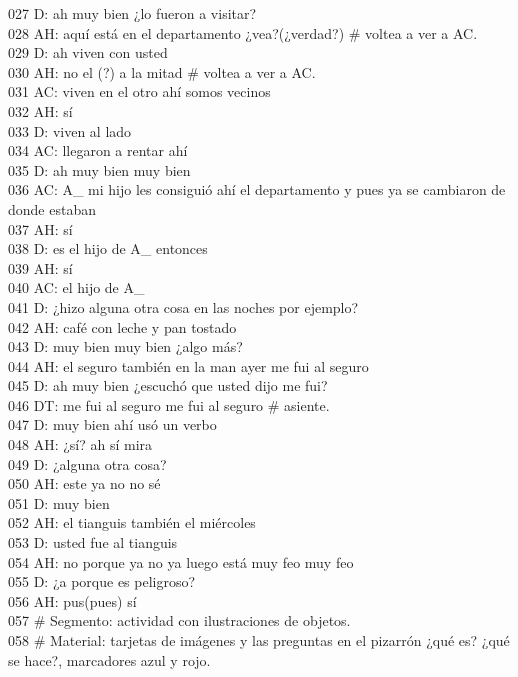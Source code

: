 027 D: ah muy bien ¿lo fueron a visitar?\\
028 AH: aquí está en el departamento ¿vea?(¿verdad?) \# voltea a ver a AC.\\
029 D: ah viven con usted\\
030 AH: no el (?) a la mitad \# voltea a ver a AC.\\
031 AC: viven en el otro ahí somos vecinos\\
032 AH: sí\\
033 D: viven al lado\\
034 AC: llegaron a rentar ahí\\
035 D: ah muy bien muy bien\\
036 AC: A\_ mi hijo les consiguió ahí el departamento y pues ya se cambiaron de donde estaban\\
037 AH: sí\\
038 D: es el hijo de A\_ entonces\\
039 AH: sí\\
040 AC: el hijo de A\_\\
041 D: ¿hizo alguna otra cosa en las noches por ejemplo?\\
042 AH: café con leche y pan tostado\\
043 D: muy bien muy bien ¿algo más?\\
044 AH: el seguro también en la man ayer me fui al seguro\\
045 D: ah muy bien ¿escuchó que usted dijo me fui?\\
046 DT: me fui al seguro me fui al seguro \# asiente.\\
047 D: muy bien ahí usó un verbo\\
048 AH: ¿sí? ah sí mira\\
049 D: ¿alguna otra cosa?\\
050 AH: este ya no no sé\\
051 D: muy bien\\
052 AH: el tianguis también el miércoles\\
053 D: usted fue al tianguis\\
054 AH: no porque ya no ya luego está muy feo muy feo\\
055 D: ¿a porque es peligroso?\\
056 AH: pus(pues) sí\\
057 \# Segmento: actividad con ilustraciones de objetos.\\
058 \# Material: tarjetas de imágenes y las preguntas en el pizarrón ¿qué es? ¿qué se hace?, marcadores azul y rojo. \\
